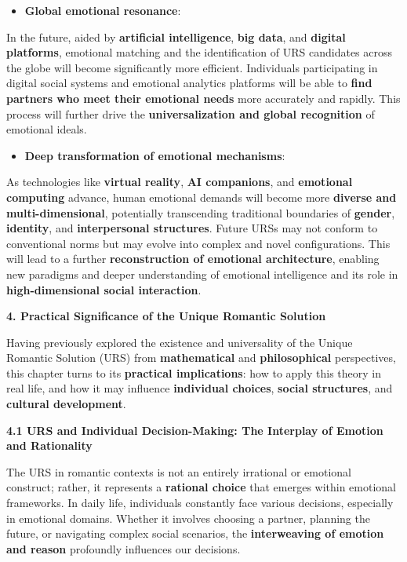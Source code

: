 \documentclass[a4paper]{article}
\begin{document}
\begin{itemize}[series=listWWNumviii,label=[F0B7?]]
\item \textbf{Global emotional resonance}: 
\end{itemize}
In the future, aided by \textbf{artificial intelligence}, \textbf{big data}, and \textbf{digital platforms}, emotional
matching and the identification of URS candidates across the globe will become significantly more efficient.
Individuals participating in digital social systems and emotional analytics platforms will be able to \textbf{find
partners who meet their emotional needs} more accurately and rapidly. This process will further drive the
\textbf{universalization and global recognition} of emotional ideals.

\begin{itemize}[resume*=listWWNumviii]
\item \textbf{Deep transformation of emotional mechanisms}: 
\end{itemize}
As technologies like \textbf{virtual reality}, \textbf{AI companions}, and \textbf{emotional computing} advance, human
emotional demands will become more \textbf{diverse and multi-dimensional}, potentially transcending traditional
boundaries of \textbf{gender}, \textbf{identity}, and \textbf{interpersonal structures}. Future URSs may not conform to
conventional norms but may evolve into complex and novel configurations. This will lead to a further
\textbf{reconstruction of emotional architecture}, enabling new paradigms and deeper understanding of emotional
intelligence and its role in \textbf{high-dimensional social interaction}.

{\centering\color[HTML]{595959}
\textbf{4. Practical Significance of the Unique Romantic Solution}
\par}

Having previously explored the existence and universality of the Unique Romantic Solution (URS) from
\textbf{mathematical} and \textbf{philosophical} perspectives, this chapter turns to its \textbf{practical
implications}: how to apply this theory in real life, and how it may influence \textbf{individual choices},
\textbf{social structures}, and \textbf{cultural development}.

\textbf{4.1 URS and Individual Decision-Making: The Interplay of Emotion and Rationality}

The URS in romantic contexts is not an entirely irrational or emotional construct; rather, it represents a
\textbf{rational choice} that emerges within emotional frameworks. In daily life, individuals constantly face various
decisions, especially in emotional domains. Whether it involves choosing a partner, planning the future, or navigating
complex social scenarios, the \textbf{interweaving of emotion and reason} profoundly influences our decisions.
\end{document}
